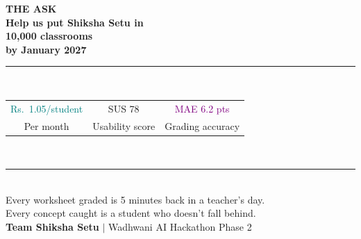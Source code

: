 \begin{frame}[plain]

\vspace{0.5cm}
\begin{center}
\colorbox{card}{\parbox{0.84\textwidth}{\centering
  \vspace{10pt}
  \textcolor{teallt}{\tiny\bfseries\MakeUppercase{The Ask}}\\[8pt]
  \textcolor{txt}{\large\textbf{Help us put Shiksha Setu in}}\\[4pt]
  \textcolor{orng}{\LARGE\textbf{10,000 classrooms}}\\[4pt]
  \textcolor{txt}{\large\textbf{by January 2027}}\\[8pt]
  \textcolor{cardbdr}{\rule{0.7\textwidth}{0.4pt}}\\[8pt]
  \begin{tabular}{ccc}
    \textcolor{teal}{\small Rs.\ 1.05/student} &
    \textcolor{orng}{\small SUS 78} &
    \textcolor{purple}{\small MAE 6.2 pts}\\
    \textcolor{txtsec}{\scriptsize Per month} &
    \textcolor{txtsec}{\scriptsize Usability score} &
    \textcolor{txtsec}{\scriptsize Grading accuracy}
  \end{tabular}\\[8pt]
  \textcolor{cardbdr}{\rule{0.7\textwidth}{0.4pt}}\\[6pt]
  \textcolor{txtsec}{\scriptsize Every worksheet graded is 5 minutes back in a teacher's day.}\\
  \textcolor{txtsec}{\scriptsize Every concept caught is a student who doesn't fall behind.}\\[8pt]
  \textcolor{teallt}{\small\textbf{Team Shiksha Setu}}\;
  \textcolor{txtsec}{\small$|$}\;
  \textcolor{txtsec}{\small Wadhwani AI Hackathon Phase 2}\\[8pt]
}}
\end{center}
\end{frame}

